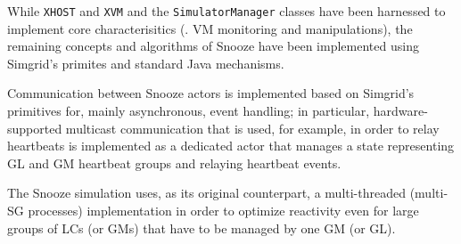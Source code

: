 While \texttt{XHOST} and \texttt{XVM} and the
\texttt{SimulatorManager} classes have been harnessed to implement
core characterisitics (\ie. VM monitoring and manipulations), the
remaining concepts and algorithms of Snooze have been implemented
using Simgrid's primites and standard Java mechanisms.

Communication between Snooze actors is
implemented based on Simgrid's primitives for, mainly asynchronous,
event handling; in particular, hardware-supported multicast
communication that is used, for example, in order to relay heartbeats
is implemented as a dedicated actor that manages a state representing
GL and GM heartbeat groups and relaying heartbeat events.

The Snooze simulation uses, as its original counterpart, a
multi-threaded (\ie multi-SG processes) implementation in order to optimize reactivity even for
large groups of LCs (or GMs) that have to be managed by one GM (or
GL).





